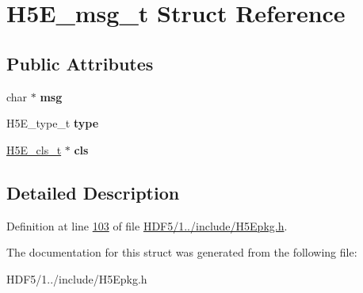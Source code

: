 \hypertarget{struct_h5_e__msg__t}{}\section{H5\+E\+\_\+msg\+\_\+t Struct Reference}
\label{struct_h5_e__msg__t}
\subsection*{Public Attributes}
\begin{DoxyCompactItemize}
\item 
\mbox{\label{struct_h5_e__msg__t_a11f4ddf44028597405f7dbf3235ea22e}} 
char $\ast$ {\bfseries msg}
\item 
\mbox{\label{struct_h5_e__msg__t_a1c96ca0139d3c6b959255abb2989f9ef}} 
H5\+E\+\_\+type\+\_\+t {\bfseries type}
\item 
\mbox{\label{struct_h5_e__msg__t_a39e4c874f964bf7b4734c999a5dd2719}} 
\hyperlink{struct_h5_e__cls__t}{H5\+E\+\_\+cls\+\_\+t} $\ast$ {\bfseries cls}
\end{DoxyCompactItemize}


\subsection{Detailed Description}


Definition at line \hyperlink{_h_d_f5_21_810_81_2include_2_h5_epkg_8h_source_l00103}{103} of file \hyperlink{_h_d_f5_21_810_81_2include_2_h5_epkg_8h_source}{H\+D\+F5/1../include/\+H5\+Epkg.\+h}.



The documentation for this struct was generated from the following file\+:\begin{DoxyCompactItemize}
\item 
H\+D\+F5/1../include/\+H5\+Epkg.\+h\end{DoxyCompactItemize}

